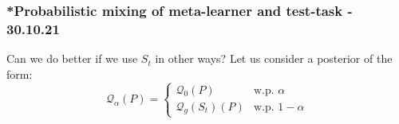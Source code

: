 \documentclass[letterpaper]{article}
\theoremstyle{definition}
\begin{document}








%
%
%
%

\subsubsection{*Probabilistic mixing of meta-learner and test-task - 30.10.21}

Can we do better if we use $S_t$ in other ways? 
Let us consider a posterior of the form:
$$ \mathcal{Q}_\alpha(P) = \begin{cases}
\mathcal{Q}_0(P) & \text{w.p. } \alpha\\
\mathcal{Q}_{g}(S_t)(P)  &\text{w.p. } 1-\alpha
\end{cases} $$
\end{document}
